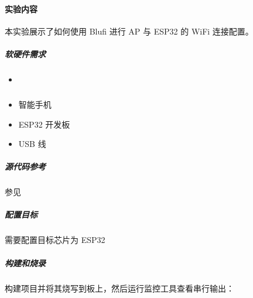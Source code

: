 \documentclass[a4paper,12pt,english]{sphinxmanual}
\begin{document}
{{\begin{enumerate}
\begin{sphinxVerbatim}[commandchars=\\\{\}]
\end{sphinxVerbatim}

\end{enumerate}


\paragraph{实验内容}
\label{\detokenize{exp-esp32/bluetooth/blufi:id4}}
\sphinxAtStartPar
本实验展示了如何使用 Blufi 进行 AP 与 ESP32 的 Wi\sphinxhyphen{}Fi 连接配置。


\subparagraph{软硬件需求}
\label{\detokenize{exp-esp32/bluetooth/blufi:id5}}\begin{itemize}
\item {} 
\sphinxAtStartPar
{\hyperref[\detokenize{exp-esp32/bluetooth/blufi:getapp}]{}}

\item {} 
\sphinxAtStartPar
智能手机

\item {} 
\sphinxAtStartPar
ESP32 开发板

\item {} 
\sphinxAtStartPar
USB 线

\end{itemize}


\subparagraph{源代码参考}
\label{\detokenize{exp-esp32/bluetooth/blufi:id6}}
\sphinxAtStartPar
参见{\hyperref[\detokenize{reference::doc}]{}}


\subparagraph{配置目标}
\label{\detokenize{exp-esp32/bluetooth/blufi:id7}}
\sphinxAtStartPar
需要配置目标芯片为 ESP32

\begin{sphinxVerbatim}[commandchars=\\\{\}]
  
\end{sphinxVerbatim}


\subparagraph{构建和烧录}
\label{\detokenize{exp-esp32/bluetooth/blufi:id8}}
\sphinxAtStartPar
构建项目并将其烧写到板上，然后运行监控工具查看串行输出：

}}
\end{document}

